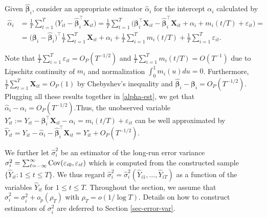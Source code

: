 \documentclass[a4paper,12pt]{article}
\begin{document}
Given $\widehat{\bm{\beta}}_i$, consider an appropriate estimator $\widehat{\alpha}_{i}$ for the intercept $\alpha_i$ calculated by
\begin{align}\label{alpha-est}
\widehat{\alpha}_i &= \frac{1}{T}\sum_{t=1}^T \big(Y_{it} - \widehat{\bm{\beta}}_i^\top \mathbf{X}_{it}\big) = \frac{1}{T}\sum_{t=1}^T \big(\bm{\beta}_i^\top \mathbf{X}_{it} - \widehat{\bm{\beta}}_i^\top \mathbf{X}_{it} + \alpha_i + m_i(t/T) + \varepsilon_{it}\big) =\\
&= \big(\bm{\beta}_i - \widehat{\bm{\beta}}_i \big)^\top\frac{1}{T}\sum_{t=1}^T  \mathbf{X}_{it} + \alpha_i + \frac{1}{T}\sum_{i=1}^T m_i(t/T) + \frac{1}{T}\sum_{i=1}^T \varepsilon_{it}.\nonumber
\end{align}

Note that $\frac{1}{T}\sum_{i=1}^T \varepsilon_{it} = O_P(T^{-1/2})$ and $\frac{1}{T}\sum_{i=1}^T m_i(t/T) = O(T^{-1})$ due to Lipschitz continuity of $m_i$ and normalization $\int_{0}^1 m_i(u)du = 0$. Furthermore, $\frac{1}{T}\sum_{t=1}^T  \mathbf{X}_{it} = O_P(1)$ by Chebyshev's inequality and $\widehat{\bm{\beta}}_i - \bm{\beta}_i = O_P (T^{-1/2})$. Plugging all these results together in \eqref{alpha-est}, we get that $\widehat{\alpha}_i - \alpha_i = O_P(T^{-1/2})$.Thus, the unobserved variable $Y_{it}^\circ := Y_{it} - \bm{\beta}_i^\top \mathbf{X}_{it} - \alpha_i = m_i(t/T) + \varepsilon_{it}$ can be well approximated by $\widehat{Y}_{it} = Y_{it} -\widehat{\alpha}_i - \widehat{\bm{\beta}}_i^\top \mathbf{X}_{it} = Y_{it}^\circ + O_P(T^{-1/2})$.

We further let $\widehat{\sigma}_i^2$ be an estimator of the long-run error variance $\sigma_i^2 = \sum\nolimits_{\ell=-\infty}^{\infty} \textnormal{Cov}(\varepsilon_{i0}, \varepsilon_{i\ell})$ which is computed from the constructed sample $\{ \widehat{Y}_{it}: 1 \le t \le T \}$. We thus regard $\widehat{\sigma}_i^2 = \widehat{\sigma}_i^2(\widehat{Y}_{i1},\ldots,\widehat{Y}_{iT})$ as a function of the variables $\widehat{Y}_{it}$ for $1 \le t \le T$. Throughout the section, we assume that $\widehat{\sigma}_i^2 = \sigma_i^2 + o_p(\rho_T)$ with $\rho_T = o(1/\log T)$. Details on how to construct estimators of $\sigma_i^2$ are deferred to Section \ref{sec-error-var}. 
\end{document}
